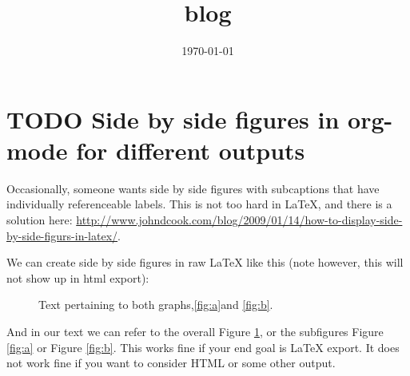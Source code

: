 \documentclass[11pt]{article}
\date{\today}
\title{blog}
\begin{document}
\section{{\bfseries\sffamily TODO} Side by side figures in org-mode for different outputs}
\label{sec-1}
Occasionally, someone wants side by side figures with subcaptions that have individually referenceable labels. This is not too hard in \LaTeX{}, and there is a solution here:  \url{http://www.johndcook.com/blog/2009/01/14/how-to-display-side-by-side-figurs-in-latex/}.

We can create side by side figures in raw \LaTeX{} like this (note however, this will not show up in html export):

\begin{figure}
\enskip %
\caption{Text pertaining to both graphs,\ref{fig:a}and \ref{fig:b}. \label{fig12}}
\end{figure}

And in our text we can refer to the overall Figure \ref{fig12}, or the subfigures Figure \ref{fig:a} or Figure \ref{fig:b}. This works fine if your end goal is \LaTeX{} export. It does not work fine if you want to consider HTML or some other output.
\end{document}
